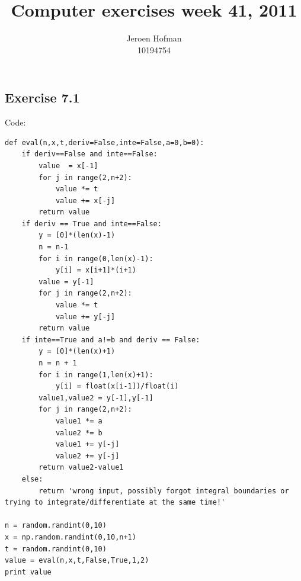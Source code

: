 \documentclass[10pt,a4paper]{article}
\begin{document}

\author{Jeroen Hofman\\
		10194754\\
		}
\title{Computer exercises week 41, 2011\\
		}
\date{}
\maketitle

\subsection*{Exercise 7.1}
Code:
\begin{lstlisting}
def eval(n,x,t,deriv=False,inte=False,a=0,b=0):
    if deriv==False and inte==False:
        value  = x[-1]
        for j in range(2,n+2):
            value *= t
            value += x[-j]
        return value
    if deriv == True and inte==False:
        y = [0]*(len(x)-1)
        n = n-1
        for i in range(0,len(x)-1):
            y[i] = x[i+1]*(i+1)
        value = y[-1]
        for j in range(2,n+2):
            value *= t
            value += y[-j]
        return value
    if inte==True and a!=b and deriv == False:
        y = [0]*(len(x)+1)
        n = n + 1
        for i in range(1,len(x)+1):
            y[i] = float(x[i-1])/float(i)
        value1,value2 = y[-1],y[-1]
        for j in range(2,n+2):
            value1 *= a
            value2 *= b
            value1 += y[-j]
            value2 += y[-j]
        return value2-value1
    else: 
        return 'wrong input, possibly forgot integral boundaries or trying to integrate/differentiate at the same time!'

n = random.randint(0,10)
x = np.random.randint(0,10,n+1)
t = random.randint(0,10)
value = eval(n,x,t,False,True,1,2)
print value
\end{lstlisting}
\end{document}
